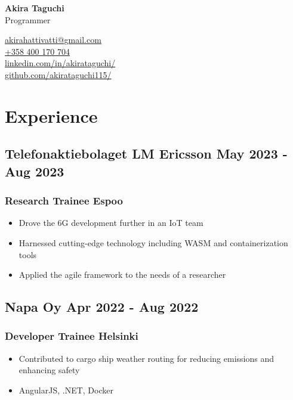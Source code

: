 \documentclass[11pt]{article} %
\begin{document}
\begin{center}
	\begin{minipage}{0.5\textwidth}
		{\Huge\bfseries
			Akira Taguchi %
		} \\ \medskip
		Programmer %
	\end{minipage} \hfill
	\begin{minipage}{0.4\textwidth}
		\raggedleft
		\href{mailto:akirahattivatti@gmail.com}{akirahattivatti@gmail.com} \\
		\href{tel:+358400170704}{+358 400 170 704} \\
		\href{https://www.linkedin.com/in/akirataguchi/}{linkedin.com/in/akirataguchi/} \\
		\href{https://github.com/akirataguchi115/}{github.com/akirataguchi115/}
	\end{minipage}
\end{center}

\section{Experience}
\subsection{Telefonaktiebolaget LM Ericsson \hfill May 2023 - Aug 2023}
\subsubsection{Research Trainee \hfill  Espoo}
\begin{itemize}
  \item Drove the 6G development further in an IoT team
  \item Harnessed cutting-edge technology including WASM and containerization tools
	\item Applied the agile framework to the needs of a researcher
\end{itemize}

\subsection{Napa Oy \hfill Apr 2022 - Aug 2022}
\subsubsection{Developer Trainee \hfill Helsinki}
\begin{itemize}
	\item Contributed to cargo ship weather routing for reducing emissions and enhancing safety
	\item AngularJS, .NET, Docker
\end{itemize}
\end{document}
